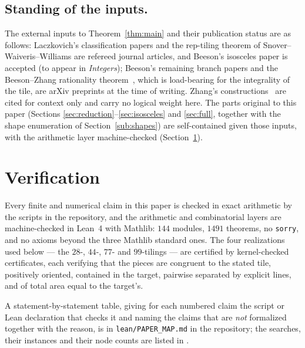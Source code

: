 \documentclass[11pt,reqno]{amsart}
\theoremstyle{plain}
\theoremstyle{definition}
\begin{document}
\subsection*{Standing of the inputs.}
The external inputs to Theorem~\ref{thm:main} and their publication status are as follows:
Laczkovich's classification papers \cite{Laczkovich1995,Laczkovich2012} and the rep-tiling theorem
of Snover--Waiveris--Williams \cite{SWW} are refereed journal articles, and Beeson's isosceles
paper \cite{BeesonIso} is accepted (to appear in \emph{Integers}); Beeson's remaining branch papers
\cite{BeesonI,BeesonIII,BeesonSeven,BeesonEq} and the Beeson--Zhang rationality
theorem~\cite{BeesonZhang}, which is load-bearing for the integrality of the tile, are arXiv
preprints at the time of writing. Zhang's constructions~\cite{Zhang} are cited for context only and
carry no logical weight here. The parts original to this paper (Sections
\ref{sec:reduction}--\ref{sec:isosceles} and \ref{sec:full}, together with the shape enumeration
of Section~\ref{sub:shapes}) are self-contained given those inputs, with the arithmetic layer
machine-checked (Section~\ref{sec:verification}).

\section{Verification}\label{sec:verification}

Every finite and numerical claim in this paper is checked in exact arithmetic by the scripts in the
repository, and the arithmetic and combinatorial layers are machine-checked in Lean~4 with Mathlib:
$144$ modules, $1491$ theorems, no \texttt{sorry}, and no axioms beyond the three Mathlib standard ones.
The four realizations used below --- the $28$-, $44$-, $77$- and $99$-tilings --- are certified by
kernel-checked certificates, each verifying that the pieces are congruent to the stated tile,
positively oriented, contained in the target, pairwise separated by explicit lines, and of total area
equal to the target's.

A statement-by-statement table, giving for each numbered claim the script or Lean declaration that
checks it and naming the claims that are \emph{not} formalized together with the reason, is in
\texttt{lean/PAPER\_MAP.md} in the repository; the searches, their instances and their node counts are
listed in \cite{Obstructions}.
\end{document}
